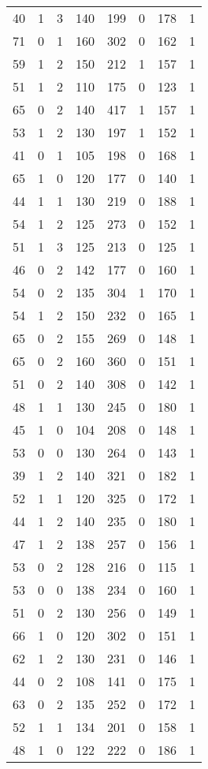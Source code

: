 \documentclass{article}
\begin{document}
\begin{longtable}{*{8}{c}}
40 & 1 & 3 & 140 & 199 & 0 & 178 & 1 \\
71 & 0 & 1 & 160 & 302 & 0 & 162 & 1 \\
59 & 1 & 2 & 150 & 212 & 1 & 157 & 1 \\
51 & 1 & 2 & 110 & 175 & 0 & 123 & 1 \\
65 & 0 & 2 & 140 & 417 & 1 & 157 & 1 \\
53 & 1 & 2 & 130 & 197 & 1 & 152 & 1 \\
41 & 0 & 1 & 105 & 198 & 0 & 168 & 1 \\
65 & 1 & 0 & 120 & 177 & 0 & 140 & 1 \\
44 & 1 & 1 & 130 & 219 & 0 & 188 & 1 \\
54 & 1 & 2 & 125 & 273 & 0 & 152 & 1 \\
51 & 1 & 3 & 125 & 213 & 0 & 125 & 1 \\
46 & 0 & 2 & 142 & 177 & 0 & 160 & 1 \\
54 & 0 & 2 & 135 & 304 & 1 & 170 & 1 \\
54 & 1 & 2 & 150 & 232 & 0 & 165 & 1 \\
65 & 0 & 2 & 155 & 269 & 0 & 148 & 1 \\
65 & 0 & 2 & 160 & 360 & 0 & 151 & 1 \\
51 & 0 & 2 & 140 & 308 & 0 & 142 & 1 \\
48 & 1 & 1 & 130 & 245 & 0 & 180 & 1 \\
45 & 1 & 0 & 104 & 208 & 0 & 148 & 1 \\
53 & 0 & 0 & 130 & 264 & 0 & 143 & 1 \\
39 & 1 & 2 & 140 & 321 & 0 & 182 & 1 \\
52 & 1 & 1 & 120 & 325 & 0 & 172 & 1 \\
44 & 1 & 2 & 140 & 235 & 0 & 180 & 1 \\
47 & 1 & 2 & 138 & 257 & 0 & 156 & 1 \\
53 & 0 & 2 & 128 & 216 & 0 & 115 & 1 \\
53 & 0 & 0 & 138 & 234 & 0 & 160 & 1 \\
51 & 0 & 2 & 130 & 256 & 0 & 149 & 1 \\
66 & 1 & 0 & 120 & 302 & 0 & 151 & 1 \\
62 & 1 & 2 & 130 & 231 & 0 & 146 & 1 \\
44 & 0 & 2 & 108 & 141 & 0 & 175 & 1 \\
63 & 0 & 2 & 135 & 252 & 0 & 172 & 1 \\
52 & 1 & 1 & 134 & 201 & 0 & 158 & 1 \\
48 & 1 & 0 & 122 & 222 & 0 & 186 & 1 \\

\end{longtable}
\end{document}
